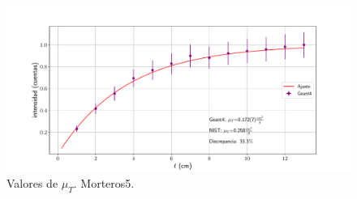 \begin{figure}[H]
	\centering
	\includegraphics[width=1.0\linewidth]{Kap4/mu_T-m5.pdf}
	\caption{Valores de $\mu_T$. Morteros5.}
	\label{fig:mut-m5}
\end{figure}